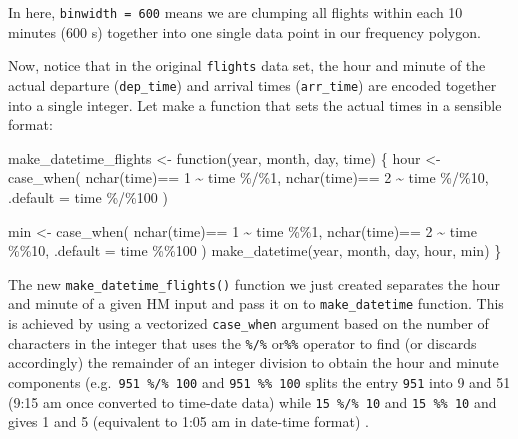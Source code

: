 \documentclass[
  letterpaper,
  DIV=11,
  numbers=noendperiod]{scrartcl}
\newenvironment{Shaded}{\begin{snugshade}}{\end{snugshade}}
\newcommand{\AttributeTok}[1]{\textcolor[rgb]{0.40,0.45,0.13}{#1}}
\newcommand{\ControlFlowTok}[1]{\textcolor[rgb]{0.00,0.23,0.31}{#1}}
\newcommand{\DecValTok}[1]{\textcolor[rgb]{0.68,0.00,0.00}{#1}}
\newcommand{\FunctionTok}[1]{\textcolor[rgb]{0.28,0.35,0.67}{#1}}
\newcommand{\NormalTok}[1]{\textcolor[rgb]{0.00,0.23,0.31}{#1}}
\newcommand{\OtherTok}[1]{\textcolor[rgb]{0.00,0.23,0.31}{#1}}
\newcommand{\SpecialCharTok}[1]{\textcolor[rgb]{0.37,0.37,0.37}{#1}}
\begin{document}
In here, \texttt{binwidth\ =\ 600} means we are clumping all flights
within each 10 minutes (600 s) together into one single data point in
our frequency polygon.

Now, notice that in the original \texttt{flights} data set, the hour and
minute of the actual departure (\texttt{dep\_time}) and arrival times
(\texttt{arr\_time}) are encoded together into a single integer. Let
make a function that sets the actual times in a sensible format:

\begin{Shaded}
\begin{Highlighting}[]
\NormalTok{make\_datetime\_flights }\OtherTok{\textless{}{-}} \ControlFlowTok{function}\NormalTok{(year, month, day, time) \{}
\NormalTok{  hour }\OtherTok{\textless{}{-}} \FunctionTok{case\_when}\NormalTok{(}
      \FunctionTok{nchar}\NormalTok{(time)}\SpecialCharTok{==} \DecValTok{1} \SpecialCharTok{\textasciitilde{}}\NormalTok{ time  }\SpecialCharTok{\%/\%}\DecValTok{1}\NormalTok{,}
      \FunctionTok{nchar}\NormalTok{(time)}\SpecialCharTok{==} \DecValTok{2} \SpecialCharTok{\textasciitilde{}}\NormalTok{ time  }\SpecialCharTok{\%/\%}\DecValTok{10}\NormalTok{,}
      \AttributeTok{.default =}\NormalTok{  time  }\SpecialCharTok{\%/\%}\DecValTok{100}
\NormalTok{    )}

\NormalTok{  min }\OtherTok{\textless{}{-}} \FunctionTok{case\_when}\NormalTok{(}
      \FunctionTok{nchar}\NormalTok{(time)}\SpecialCharTok{==} \DecValTok{1} \SpecialCharTok{\textasciitilde{}}\NormalTok{ time  }\SpecialCharTok{\%\%}\DecValTok{1}\NormalTok{,}
      \FunctionTok{nchar}\NormalTok{(time)}\SpecialCharTok{==} \DecValTok{2} \SpecialCharTok{\textasciitilde{}}\NormalTok{ time  }\SpecialCharTok{\%\%}\DecValTok{10}\NormalTok{,}
      \AttributeTok{.default =}\NormalTok{  time  }\SpecialCharTok{\%\%}\DecValTok{100}
\NormalTok{    )}
  \FunctionTok{make\_datetime}\NormalTok{(year, month, day, hour, min)}
\NormalTok{\}}
\end{Highlighting}
\end{Shaded}

The new \texttt{make\_datetime\_flights()} function we just created
separates the hour and minute of a given HM input and pass it on to
\texttt{make\_datetime} function. This is achieved by using a vectorized
\texttt{case\_when} argument based on the number of characters in the
integer that uses the \texttt{\%/\%} or\texttt{\%\%} operator to find
(or discards accordingly) the remainder of an integer division to obtain
the hour and minute components (e.g.~\texttt{951\ \%/\%\ 100} and
\texttt{951\ \%\%\ 100} splits the entry \texttt{951} into 9 and 51
(9:15 am once converted to time-date data) while \texttt{15\ \%/\%\ 10}
and \texttt{15\ \%\%\ 10} and gives 1 and 5 (equivalent to 1:05 am in
date-time format) .
\end{document}
